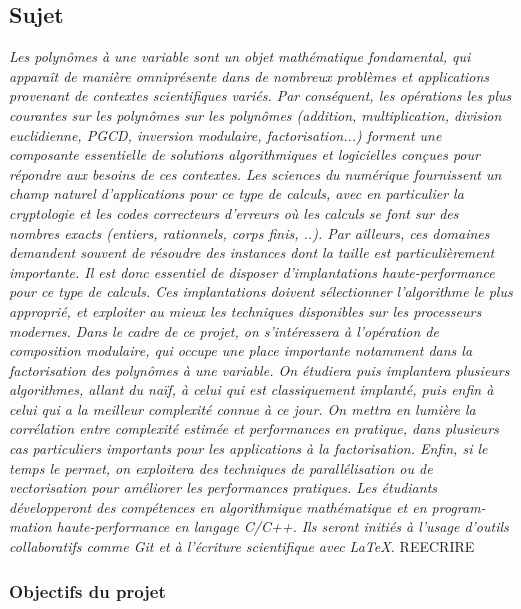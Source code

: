 \documentclass[a4paper]{article}
\begin{document}
\subsection{Sujet}
\textit{
Les polynômes à une variable sont un objet mathématique fondamental, qui
apparaît de manière omniprésente dans de nombreux problèmes et applications provenant
de contextes scientifiques variés. Par conséquent, les opérations les plus courantes sur les
polynômes sur les polynômes (addition, multiplication, division euclidienne, PGCD, inversion
modulaire, factorisation...) forment une composante essentielle de solutions algorithmiques et
logicielles conçues pour répondre aux besoins de ces contextes.
Les sciences du numérique fournissent un champ naturel d’applications pour ce type de calculs,
avec en particulier la cryptologie et les codes correcteurs d’erreurs où les calculs se font sur des
nombres exacts (entiers, rationnels, corps finis, ..). Par ailleurs, ces domaines demandent souvent
de résoudre des instances dont la taille est particulièrement importante. Il est donc essentiel de
disposer d’implantations haute-performance pour ce type de calculs. Ces implantations doivent
sélectionner l’algorithme le plus approprié, et exploiter au mieux les techniques disponibles sur
les processeurs modernes.
Dans le cadre de ce projet, on s’intéressera à l’opération de composition modulaire, qui occupe
une place importante notamment dans la factorisation des polynômes à une variable. On
étudiera puis implantera plusieurs algorithmes, allant du naïf, à celui qui est classiquement
implanté, puis enfin à celui qui a la meilleur complexité connue à ce jour. On mettra en
lumière la corrélation entre complexité estimée et performances en pratique, dans plusieurs cas
particuliers importants pour les applications à la factorisation. Enfin, si le temps le permet, on
exploitera des techniques de parallélisation ou de vectorisation pour améliorer les performances
pratiques.
Les étudiants développeront des compétences en algorithmique mathématique et en program-
mation haute-performance en langage C/C++. Ils seront initiés à l’usage d’outils collaboratifs
comme Git et à l’écriture scientifique avec LaTeX.
} REECRIRE

\subsubsection*{Objectifs du projet}
\end{document}
